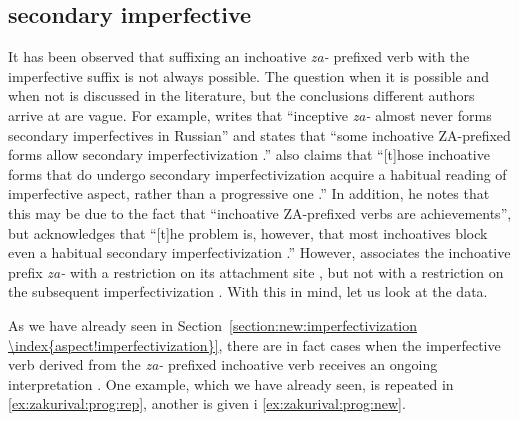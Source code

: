 \subsection{secondary imperfective }
It has been observed that suffixing an inchoative  \textit{za-}  prefixed verb with the imperfective suffix   is not always possible. The question when it is possible and when not is discussed in the literature, but the conclusions different authors arrive at are vague. For example, \citet[230]{Svenonius:04b} writes that ``inceptive  \textit{za-}   almost never forms secondary imperfectives  in Russian'' and \citet[220]{Braginsky:08} states that ``some inchoative  ZA-prefixed forms allow secondary imperfectivization .'' \citet[231]{Braginsky:08} also claims that ``[t]hose inchoative  forms that do undergo secondary imperfectivization  acquire a habitual reading  of imperfective aspect, rather than a progressive one .'' In addition, he notes that this may be due to the fact that ``inchoative  ZA-prefixed verbs are achievements'', but acknowledges that ``[t]he problem is, however, that most inchoatives block even a habitual secondary imperfectivization .'' However, \citet{Tatevosov:09} associates the inchoative  prefix \textit{za-}   with a restriction on its attachment site , but not with a restriction on the subsequent imperfectivization . With this in mind, let us look at the data. 

As we have already seen in Section~\ref{section:new:imperfectivization \index{aspect!imperfectivization}}, there are in fact cases when the imperfective verb  derived from the \textit{za-}  prefixed inchoative  verb receives an ongoing interpretation . One example, which we have already seen, is repeated in \ref{ex:zakurival:prog:rep}, another is given i \ref{ex:zakurival:prog:new}.

